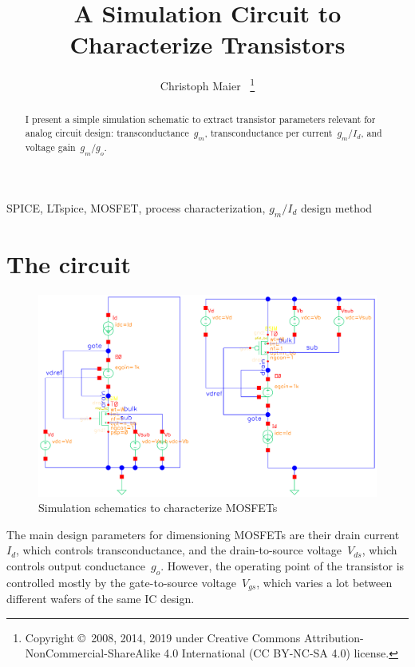 \documentclass[journal]{IEEEtran}
\begin{document}
\title{A Simulation Circuit to Characterize Transistors}
\author{Christoph Maier~%
\thanks{Copyright \copyright\ 2008, 2014, 2019 under Creative Commons
Attribution-NonCommercial-ShareAlike 4.0 International (CC BY-NC-SA 4.0) license.}}%
\maketitle
\begin{abstract}\boldmath
I present a simple simulation schematic to extract transistor parameters relevant for analog circuit design:
transconductance~$g_m$, transconductance per current~$g_m/I_d$, and voltage gain~$g_m/g_o$.
\end{abstract}


\begin{IEEEkeywords}
SPICE, LTspice, MOSFET, process characterization, $g_m/I_d$ design method
\end{IEEEkeywords}

\IEEEpeerreviewmaketitle
\section{The circuit}
\begin{figure}[h]
\centering
\includegraphics[width=1.0\columnwidth]{figures/mostest_fb.pdf}
\caption{Simulation schematics to characterize MOSFETs}
\label{fig:schematics}
\end{figure}
%
The main design parameters for dimensioning MOSFETs are their drain current~$I_d$, 
which controls transconductance, 
and the drain-to-source voltage~$V_{ds}$, which controls output conductance~$g_o$.
However, the operating point of the transistor is controlled mostly by the gate-to-source voltage~$V_{gs}$, which varies a lot between different wafers of the same IC design.
\end{document}
